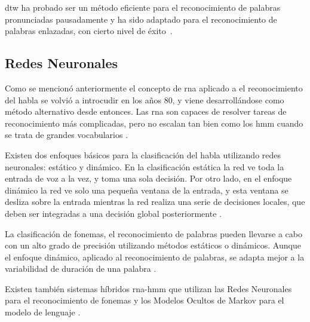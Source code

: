 \gls{dtw} ha probado ser un m\'etodo eficiente para el reconocimiento de palabras pronunciadas 
pausadamente \cite{MyersALevel1981} y ha sido adaptado para el reconocimiento de palabras enlazadas,
con cierto nivel de \mbox{\'exito \cite{MyersALevel1981, SakoeTwoLevel1979, RabinerApplication1980}}.

\subsection{Redes Neuronales}
\label{sec:otrosModelosANN}

Como se mencion\'o anteriormente el concepto de \gls{rna} aplicado a el reconocimiento
del habla se volvi\'o a introcudir en los a\~nos 80, 
y viene desarroll\'andose como m\'etodo alternativo desde entonces. Las \gls{rna} son capaces de resolver tareas de reconocimiento
m\'as complicadas, pero no escalan tan bien como los \gls{hmm} cuando se trata de grandes vocabularios \cite{VimalaReview2012}.

Existen dos enfoques b\'asicos para la clasificaci\'on del habla utilizando redes neuronales: est\'atico y din\'amico. En la
clasificaci\'on est\'atica la red ve toda la entrada de voz a la vez, y toma una sola decisi\'on. Por otro lado, en el enfoque
din\'amico la red ve solo una peque\~na ventana de la entrada, y esta ventana se desliza sobre la entrada mientras la red
realiza una serie de decisiones locales, que deben ser integradas a una decisi\'on global posteriormente \cite{TebelskisSpeech1995}.

La clasificaci\'on de fonemas, el reconocimiento de palabras pueden llevarse a cabo con un alto
grado de precisi\'on utilizando m\'etodos est\'aticos o din\'amicos. Aunque el enfoque din\'amico, aplicado al reconocimiento de
palabras, se adapta mejor a la variabilidad de duraci\'on de una palabra \cite{TebelskisSpeech1995}.

Existen tambi\'en sistemas h\'ibridos \gls{rna}-\gls{hmm} que utilizan las Redes Neuronales para el reconocimiento de fonemas y los Modelos
Ocultos de Markov para el modelo de lenguaje \cite{VimalaReview2012}.
